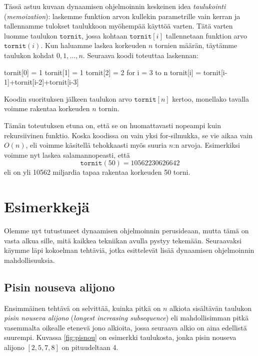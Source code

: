 
Tässä astuu kuvaan dynaamisen ohjelmoinnin keskeinen idea
\emph{taulukointi} (\emph{memoization}):
laskemme funktion arvon kullekin parametrille vain kerran
ja tallennamme tulokset taulukkoon myöhempää käyttöä varten.
Tätä varten luomme taulukon $\texttt{tornit}$,
jossa kohtaan $\texttt{tornit}[i]$ tallennetaan funktion
arvo $\texttt{tornit}(i)$.
Kun haluamme laskea korkeuden $n$ tornien määrän,
täytämme taulukon kohdat $0,1,\dots,n$.
Seuraava koodi toteuttaa laskennan:

\begin{code}
tornit[0] = 1
tornit[1] = 1
tornit[2] = 2
for i = 3 to n
    tornit[i] = tornit[i-1]+tornit[i-2]+tornit[i-3]
\end{code}

Koodin suorituksen jälkeen taulukon arvo $\texttt{tornit}[n]$
kertoo, monellako tavalla voimme rakentaa
korkeuden $n$ tornin.

Tämän toteutuksen etuna on, että se on huomattavasti
nopeampi kuin rekursiivinen funktio.
Koska koodissa on vain yksi for-silmukka, se vie aikaa
vain $O(n)$, eli voimme käsitellä tehokkaasti myös
suuria $n$:n arvoja.
Esimerkiksi voimme nyt laskea salamannopeasti, että
\[
\texttt{tornit}(50) = 10562230626642
\]
eli on yli 10562 miljardia tapaa rakentaa korkeuden 50 torni.

\section{Esimerkkejä}

Olemme nyt tutustuneet dynaamisen ohjelmoinnin perusideaan,
mutta tämä on vasta alkua sille, mitä kaikkea tekniikan
avulla pystyy tekemään.
Seuraavaksi käymme läpi kokoelman tehtäviä,
jotka esittelevät lisää dynaamisen ohjelmoinnin mahdollisuuksia.

\subsection{Pisin nouseva alijono}


Ensimmäinen tehtävä on selvittää, kuinka pitkä on
$n$ alkiota sisältävän taulukon \emph{pisin nouseva alijono}
(\emph{longest increasing subsequence}) eli
mahdollisimman pitkä vasemmalta oikealle etenevä jono alkioita,
jossa seuraava alkio on aina edellistä suurempi.
Kuvassa \ref{fig:pisnou} on esimerkki taulukosta,
jonka pisin nouseva alijono $[2,5,7,8]$ on pituudeltaan 4.

